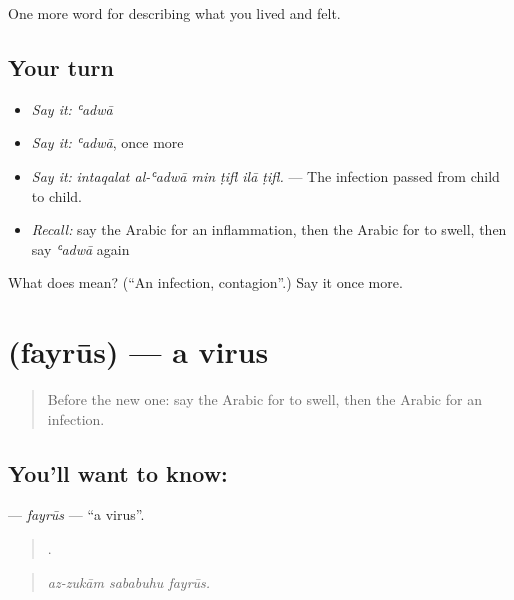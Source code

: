 \begin{grammarlens}[title={What you've built}]
One more word for describing what you lived and felt.
\end{grammarlens}

\subsection*{Your turn}
\begin{itemize}
\raggedright
  \item \emph{Say it:} \emph{ʿadwā}
  \item \emph{Say it:} \emph{ʿadwā}, once more
  \item \emph{Say it:} \emph{intaqalat al-ʿadwā min ṭifl ilā ṭifl.} — The infection passed from child to child.
  \item \emph{Recall:} say the Arabic for an inflammation, then the Arabic for to swell, then say \emph{ʿadwā} again
\end{itemize}

\begin{tcolorbox}[breakable,colback=teal!4,colframe=teal!35!black,title={Before you move on}]
What does  mean? (\textquotedblleft{}An infection, contagion\textquotedblright{}.) Say it once more.
\end{tcolorbox}
\section[\texorpdfstring{\ar{فيروس} (fayrūs)}{فيروس (fayrūs)}]{ (fayrūs) — a virus}

\label{lesson:AR-C509-fayrus}



\begin{quote}
Before the new one: say the Arabic for to swell, then the Arabic for an infection.
\end{quote}

\subsection*{You'll want to know: }
\textbf{} — \emph{fayrūs} — \textquotedblleft{}a virus\textquotedblright{}.

\begin{quote}
  .
\end{quote}

\begin{quote}
\emph{az-zukām sababuhu fayrūs.}
\end{quote}

